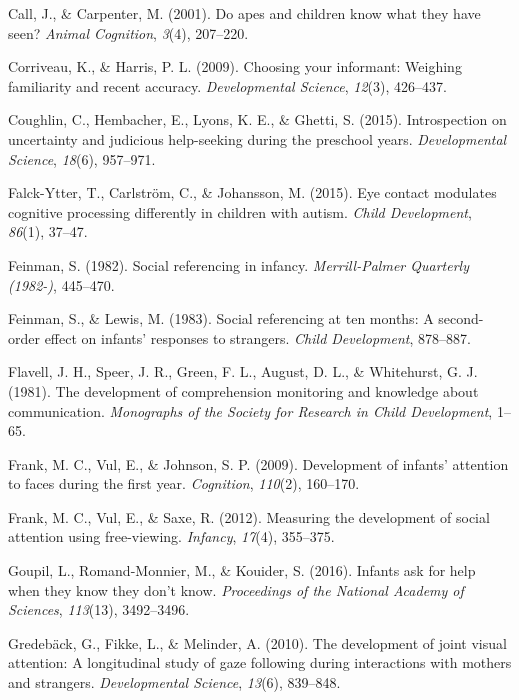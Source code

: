 \documentclass[floatsintext,man]{apa6}
\theoremstyle{definition}
\theoremstyle{definition}
\theoremstyle{definition}
\theoremstyle{remark}
\begin{document}
\hypertarget{ref-call2001apes}{}
Call, J., \& Carpenter, M. (2001). Do apes and children know what they
have seen? \emph{Animal Cognition}, \emph{3}(4), 207--220.

\hypertarget{ref-corriveau2009choosing}{}
Corriveau, K., \& Harris, P. L. (2009). Choosing your informant:
Weighing familiarity and recent accuracy. \emph{Developmental Science},
\emph{12}(3), 426--437.

\hypertarget{ref-coughlin2015introspection}{}
Coughlin, C., Hembacher, E., Lyons, K. E., \& Ghetti, S. (2015).
Introspection on uncertainty and judicious help-seeking during the
preschool years. \emph{Developmental Science}, \emph{18}(6), 957--971.

\hypertarget{ref-falck2015eye}{}
Falck-Ytter, T., Carlström, C., \& Johansson, M. (2015). Eye contact
modulates cognitive processing differently in children with autism.
\emph{Child Development}, \emph{86}(1), 37--47.

\hypertarget{ref-feinman1982social}{}
Feinman, S. (1982). Social referencing in infancy. \emph{Merrill-Palmer
Quarterly (1982-)}, 445--470.

\hypertarget{ref-feinman1983social}{}
Feinman, S., \& Lewis, M. (1983). Social referencing at ten months: A
second-order effect on infants' responses to strangers. \emph{Child
Development}, 878--887.

\hypertarget{ref-flavell1981development}{}
Flavell, J. H., Speer, J. R., Green, F. L., August, D. L., \&
Whitehurst, G. J. (1981). The development of comprehension monitoring
and knowledge about communication. \emph{Monographs of the Society for
Research in Child Development}, 1--65.

\hypertarget{ref-frank2009development}{}
Frank, M. C., Vul, E., \& Johnson, S. P. (2009). Development of infants'
attention to faces during the first year. \emph{Cognition},
\emph{110}(2), 160--170.

\hypertarget{ref-frank2012measuring}{}
Frank, M. C., Vul, E., \& Saxe, R. (2012). Measuring the development of
social attention using free-viewing. \emph{Infancy}, \emph{17}(4),
355--375.

\hypertarget{ref-goupil2016infants}{}
Goupil, L., Romand-Monnier, M., \& Kouider, S. (2016). Infants ask for
help when they know they don't know. \emph{Proceedings of the National
Academy of Sciences}, \emph{113}(13), 3492--3496.

\hypertarget{ref-gredeback2010development}{}
Gredebäck, G., Fikke, L., \& Melinder, A. (2010). The development of
joint visual attention: A longitudinal study of gaze following during
interactions with mothers and strangers. \emph{Developmental Science},
\emph{13}(6), 839--848.
\end{document}
